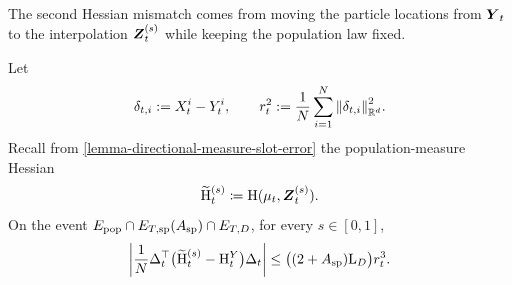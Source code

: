 The second Hessian mismatch comes from moving the particle locations from \(\boldsymbol{Y}_t\) to the interpolation \(\boldsymbol{Z}_t^{(s)}\) while keeping the population law fixed.

\begin{lemma}
\label{lemma-directional-point-slot-error}
Let
\[
    \delta_{t,i}:=X_t^i-Y_t^i,
    \qquad
    r_t^2:=\frac1N\sum_{i=1}^N\norm{\delta_{t,i}}_{\mathbb R^d}^2.
\]
Recall from \cref{lemma-directional-measure-slot-error} the
population-measure Hessian
\begin{equation}
    \widetilde{\mathrm{H}}_t^{(s)}
    \coloneq
    \mathrm{H}(\mu_t,\boldsymbol{Z}_t^{(s)}).
\end{equation}
On the event
\(E_{\rm pop}\cap E_{T,\mathrm{sp}}(A_{\mathrm{sp}})\cap E_{T,D}\),
for every \(s\in[0,1]\),
\begin{equation}
\label{eq-directional-point-slot-bound}
    \left|
    \frac1N
    \Delta_t^\top
    \bigl(
        \widetilde{\mathrm{H}}_t^{(s)}-
        \mathrm{H}_t^Y
    \bigr)
    \Delta_t
    \right|
    \le
    \bigl((2+A_{\mathrm{sp}})\mathrm L_D\bigr)r_t^3.
\end{equation}
\end{lemma}

